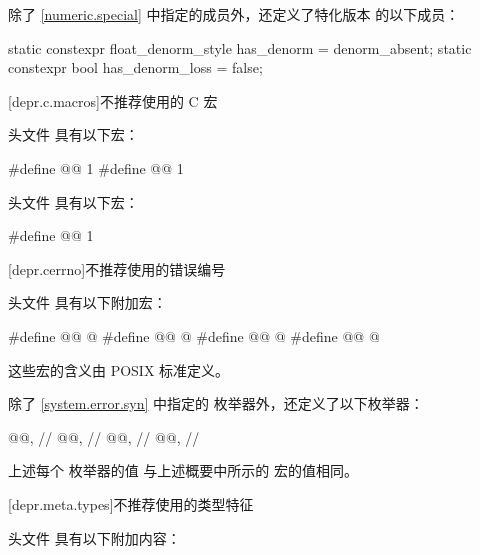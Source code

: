 \pnum
除了 \ref{numeric.special} 中指定的成员外，还定义了特化版本  的以下成员：
%
%
\begin{codeblock}
static constexpr float_denorm_style has_denorm = denorm_absent;
static constexpr bool has_denorm_loss = false;
\end{codeblock}

[depr.c.macros]{不推荐使用的 C 宏}

\pnum
头文件  具有以下宏：
\begin{codeblock}
#define @@ 1
#define @@ 1
\end{codeblock}

\pnum
头文件  具有以下宏：
\begin{codeblock}
#define @@ 1
\end{codeblock}

[depr.cerrno]{不推荐使用的错误编号}

\pnum
头文件  具有以下附加宏：

\begin{codeblock}
#define @@ @\seebelow@
#define @@ @\seebelow@
#define @@ @\seebelow@
#define @@ @\seebelow@
\end{codeblock}

\pnum
这些宏的含义由 POSIX 标准定义。

\pnum
除了 \ref{system.error.syn} 中指定的  枚举器外，还定义了以下枚举器：

\begin{codeblock}
@@,               // 
@@,                // 
@@,                       // 
@@,                     // 
\end{codeblock}

\pnum
上述每个  枚举器的值
与上述概要中所示的  宏的值相同。

[depr.meta.types]{不推荐使用的类型特征}

\pnum
头文件 
具有以下附加内容：

